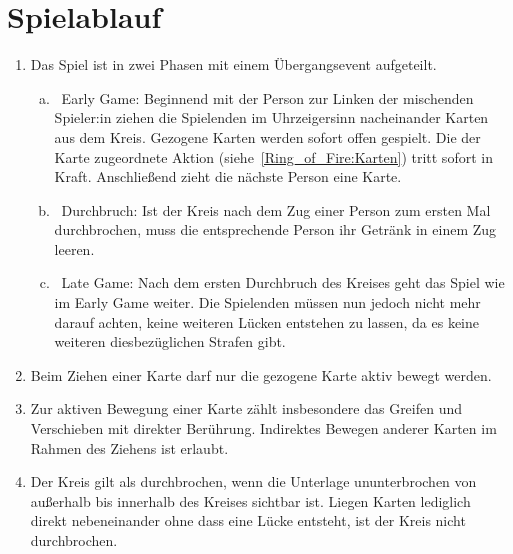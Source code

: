 \section{Spielablauf}
\begin{enumerate}[label={(\arabic*)}]
	\item
	Das Spiel ist in zwei Phasen mit einem Übergangsevent aufgeteilt.
	\begin{enumerate}[a.]
		\item
~\glqq{}Early Game\grqq{}:
		Beginnend mit der Person zur Linken der mischenden Spieler:in ziehen die Spielenden im Uhrzeigersinn nacheinander Karten aus dem Kreis.
		Gezogene Karten werden sofort offen gespielt.
		Die der Karte zugeordnete Aktion (siehe~\ref{Ring_of_Fire:Karten}) tritt sofort in Kraft.
		Anschließend zieht die nächste Person eine Karte.
		\item
~\glqq{}Durchbruch\grqq{}:
		Ist der Kreis nach dem Zug einer Person zum ersten Mal durchbrochen, muss die entsprechende Person ihr Getränk in einem Zug leeren.
		\item
~\glqq{}Late Game\grqq{}:
		Nach dem ersten Durchbruch des Kreises geht das Spiel wie im Early Game weiter.
		Die Spielenden müssen nun jedoch nicht mehr darauf achten, keine weiteren Lücken entstehen zu lassen, da es keine weiteren diesbezüglichen Strafen gibt.
	\end{enumerate}

	\item
	Beim Ziehen einer Karte darf nur die gezogene Karte aktiv bewegt werden.

	\item
	Zur aktiven Bewegung einer Karte zählt insbesondere das Greifen und Verschieben mit direkter Berührung.
	Indirektes Bewegen anderer Karten im Rahmen des Ziehens ist erlaubt.

	\item
	Der Kreis gilt als durchbrochen, wenn die Unterlage ununterbrochen von außerhalb bis innerhalb des Kreises sichtbar ist.
	Liegen Karten lediglich direkt nebeneinander ohne dass eine Lücke entsteht, ist der Kreis nicht durchbrochen.
\end{enumerate}

